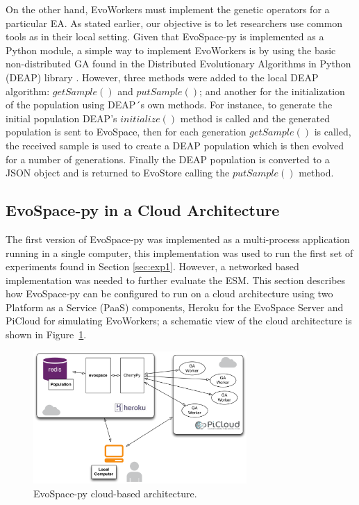 On the other hand, EvoWorkers must implement the genetic operators for a particular EA.
As stated earlier, our objective is to let researchers use common tools as in their local setting. Given that EvoSpace-py is implemented as a Python module, a simple way to implement EvoWorkers is by using the basic non-distributed GA found in the Distributed Evolutionary Algorithms in Python (DEAP) library \cite{DEAP_JMLR2012}. 
However, three methods were added to the local DEAP algorithm: $getSample()$ and  $putSample()$; and  another for the  initialization of the population using DEAP´s own methods.
For instance, to generate the initial population DEAP's $initialize()$ method  is called and the generated population is sent to EvoSpace, then for each generation $getSample()$ is called, the received sample is used to create a DEAP population which is then evolved for a number of generations. Finally the DEAP population is converted to a JSON object and is returned to EvoStore calling the $putSample()$ method.   

\subsection{EvoSpace-py in a Cloud Architecture}
The first version of EvoSpace-py was implemented as a multi-process application running in a single computer, this implementation was used to run the first set of experiments found in Section \ref{sec:exp1}. However, a networked based implementation was needed to further evaluate the ESM.  
This section describes how EvoSpace-py can be configured to run on a cloud architecture using two Platform as a Service (PaaS) components, Heroku for the EvoSpace Server and PiCloud for simulating EvoWorkers; a schematic view of the cloud architecture is shown in Figure~\ref{herokuPiCloud}.

\begin{figure}[t]
\centering
\includegraphics[width=3.2in]{herokuPiCloud.eps}
\caption{EvoSpace-py cloud-based architecture.}
\label{herokuPiCloud}
\end{figure}

